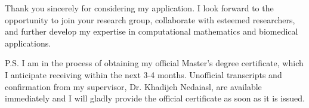 \begin{newlfm}
		Thank you sincerely for considering my application. I look forward to the opportunity to join your research group, collaborate with esteemed researchers, and further develop my expertise in computational mathematics and biomedical applications.  
		
		\vspace{1em}
		P.S. I am in the process of obtaining my official Master's degree certificate, which I anticipate receiving within the next 3-4 months. Unofficial transcripts and confirmation from my supervisor, Dr. Khadijeh Nedaiasl, are available immediately and I will gladly provide the official certificate as soon as it is issued.
		
	\end{newlfm}
